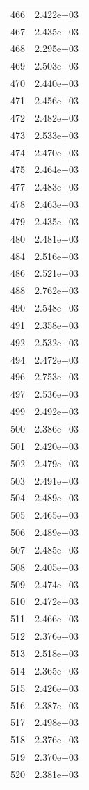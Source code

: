 \documentclass[12pt]{article}
\begin{document}
\begin{longtable}{@{}cc@{}}
466 & 2.422e+03 \\
467 & 2.435e+03 \\
468 & 2.295e+03 \\
469 & 2.503e+03 \\
470 & 2.440e+03 \\
471 & 2.456e+03 \\
472 & 2.482e+03 \\
473 & 2.533e+03 \\
474 & 2.470e+03 \\
475 & 2.464e+03 \\
477 & 2.483e+03 \\
478 & 2.463e+03 \\
479 & 2.435e+03 \\
480 & 2.481e+03 \\
484 & 2.516e+03 \\
486 & 2.521e+03 \\
488 & 2.762e+03 \\
490 & 2.548e+03 \\
491 & 2.358e+03 \\
492 & 2.532e+03 \\
494 & 2.472e+03 \\
496 & 2.753e+03 \\
497 & 2.536e+03 \\
499 & 2.492e+03 \\
500 & 2.386e+03 \\
501 & 2.420e+03 \\
502 & 2.479e+03 \\
503 & 2.491e+03 \\
504 & 2.489e+03 \\
505 & 2.465e+03 \\
506 & 2.489e+03 \\
507 & 2.485e+03 \\
508 & 2.405e+03 \\
509 & 2.474e+03 \\
510 & 2.472e+03 \\
511 & 2.466e+03 \\
512 & 2.376e+03 \\
513 & 2.518e+03 \\
514 & 2.365e+03 \\
515 & 2.426e+03 \\
516 & 2.387e+03 \\
517 & 2.498e+03 \\
518 & 2.376e+03 \\
519 & 2.370e+03 \\
520 & 2.381e+03 \\

\end{longtable}
\end{document}

